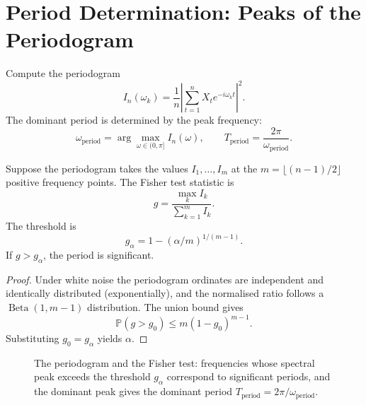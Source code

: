 \section{Period Determination: Peaks of the Periodogram}
\label{sec:ts_period_determination}

\begin{definition}\label{def:ts_period_detection}
Compute the periodogram
\[
I_n(\omega_k) = \frac{1}{n}\left|\sum_{t=1}^n X_t e^{-i\omega_k t}\right|^2.
\]
The dominant period is determined by the peak frequency:
\[
\omega_{\text{period}} = \arg\max_{\omega \in (0, \pi]} I_n(\omega), \qquad
T_{\text{period}} = \frac{2\pi}{\omega_{\text{period}}}.
\]
\end{definition}

\begin{proposition}\label{prop:ts_period_significance}
Suppose the periodogram takes the values $I_1, \dots, I_m$ at the $m = \lfloor (n-1)/2 \rfloor$ positive frequency points. The Fisher test statistic is
\[
g = \frac{\max_k I_k}{\sum_{k=1}^{m} I_k}.
\]
The threshold is
\[
g_\alpha = 1 - (\alpha/m)^{1/(m-1)}.
\]
If $g > g_\alpha$, the period is significant.
\end{proposition}

\begin{proof}
Under white noise the periodogram ordinates are independent and identically distributed (exponentially), and the normalised ratio follows a $\operatorname{Beta}(1, m-1)$ distribution. The union bound gives
\[
\mathbb{P}(g > g_0) \le m(1-g_0)^{m-1}.
\]
Substituting $g_0 = g_\alpha$ yields $\alpha$.
\end{proof}

\begin{figure}[htbp]
\centering
{}
\caption{The periodogram and the Fisher test: frequencies whose spectral peak exceeds the threshold $g_\alpha$ correspond to significant periods, and the dominant peak gives the dominant period $T_{\text{period}}=2\pi/\omega_{\text{period}}$.}
\label{fig:periodogram_fisher}
\end{figure}

